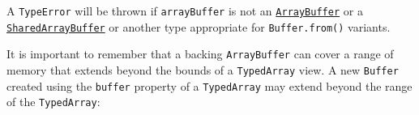 \begin{Shaded}
\begin{Highlighting}[]
\NormalTok{ \{ }\NormalTok{ \} }\OperatorTok{=} \NormalTok{(}\NormalTok{)}\OperatorTok{;}

\OperatorTok{=}  \NormalTok{(}\NormalTok{)}\OperatorTok{;}
\OperatorTok{=} \OperatorTok{,} \OperatorTok{,} \NormalTok{)}\OperatorTok{;}

\NormalTok{)}\OperatorTok{;}
\end{Highlighting}
\end{Shaded}

A \texttt{TypeError} will be thrown if \texttt{arrayBuffer} is not an
\href{https://developer.mozilla.org/en-US/docs/Web/JavaScript/Reference/Global_Objects/ArrayBuffer}{\texttt{ArrayBuffer}}
or a
\href{https://developer.mozilla.org/en-US/docs/Web/JavaScript/Reference/Global_Objects/SharedArrayBuffer}{\texttt{SharedArrayBuffer}}
or another type appropriate for \texttt{Buffer.from()} variants.

It is important to remember that a backing \texttt{ArrayBuffer} can
cover a range of memory that extends beyond the bounds of a
\texttt{TypedArray} view. A new \texttt{Buffer} created using the
\texttt{buffer} property of a \texttt{TypedArray} may extend beyond the
range of the \texttt{TypedArray}:

